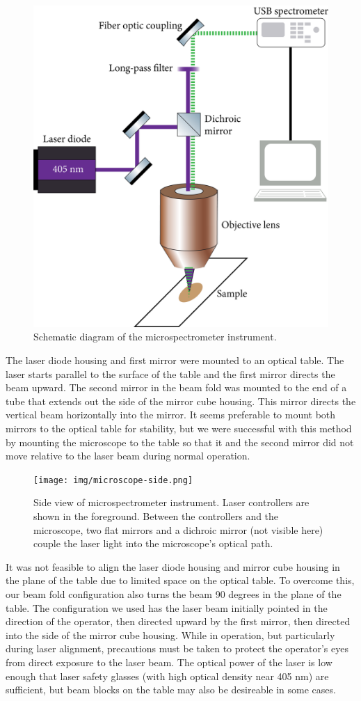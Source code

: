 \begin{figure}[h]
    \centering
    \includegraphics[width=.75\textwidth]{img/optical-diagram.png}
    \caption{Schematic diagram of the microspectrometer instrument.}
    \label{img:optical-diagram}
\end{figure}

The laser diode housing and first mirror were mounted to an optical table. The laser starts parallel to the surface of the table and the first mirror directs the beam upward. The second mirror in the beam fold was mounted to the end of a tube that extends out the side of the mirror cube housing. This mirror directs the vertical beam horizontally into the mirror. It seems preferable to mount both mirrors to the optical table for stability, but we were successful with this method by mounting the microscope to the table so that it and the second mirror did not move relative to the laser beam during normal operation.

\begin{figure}[H]
    \centering
    \texttt{[image: img/microscope-side.png]}
    \caption[Side view of microspectrometer instrument.]{Side view of microspectrometer instrument. Laser controllers are shown in the foreground. Between the controllers and the microscope, two flat mirrors and a dichroic mirror (not visible here) couple the laser light into the microscope's optical path.}
    \label{img:microscope-side}
\end{figure}

It was not feasible to align the laser diode housing and mirror cube housing in the plane of the table due to limited space on the optical table. To overcome this, our beam fold configuration also turns the beam 90 degrees in the plane of the table. The configuration we used has the laser beam initially pointed in the direction of the operator, then directed upward by the first mirror, then directed into the side of the mirror cube housing. While in operation, but particularly during laser alignment, precautions must be taken to protect the operator's eyes from direct exposure to the laser beam. The optical power of the laser is low enough that laser safety glasses (with high optical density near 405 nm) are sufficient, but beam blocks on the table may also be desireable in some cases.

